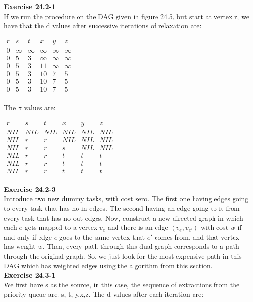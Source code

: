 \documentclass{article}
\begin{document}
\noindent\textbf{Exercise 24.2-1}\\

 If we run the procedure on the DAG given in figure 24.5, but start at vertex r, we have that the d values after successive iterations of relaxation are:

\begin{center}
$
\begin{array}{|c|c|c|c|c|c|}
r&s&t&x&y&z\\
\hline
0&\infty&\infty&\infty&\infty&\infty\\
0&5&3&\infty&\infty&\infty\\
0&5&3&11&\infty&\infty\\
0&5&3&10&7&5\\
0&5&3&10&7&5\\
0&5&3&10&7&5\\
\end{array}
$
\end{center}


The $\pi$ values are:

\begin{center}
$
\begin{array}{|c|c|c|c|c|c|}
r&s&t&x&y&z\\
\hline
NIL&NIL&NIL&NIL&NIL&NIL\\
NIL&r&r&NIL&NIL&NIL\\
NIL&r&r&s&NIL&NIL\\
NIL&r&r&t&t&t\\
NIL&r&r&t&t&t\\
NIL&r&r&t&t&t\\
\end{array}
$
\end{center}

\noindent\textbf{Exercise 24.2-3}\\
Introduce two new dummy tasks, with cost zero. The first one having edges going to every task that has no in edges. The second having an edge going to it from every task that has no out edges. Now, construct a new directed graph in which each $e$ gets mapped to a vertex $v_e$ and there is an edge $(v_e,v_{e'})$ with cost $w$ if and only if edge $e$ goes to the same vertex that $e'$ comes from, and that vertex has weight $w$. Then, every path through this dual graph corresponds to a path through the original graph. So, we just look for the most expensive path in this DAG which has weighted edges using the algorithm from this section.\\

\noindent\textbf{Exercise 24.3-1}\\
We first have s as the source, in this case, the sequence of extractions from the priority queue are: s, t, y,x,z. The d values after each iteration are:
\end{document}
